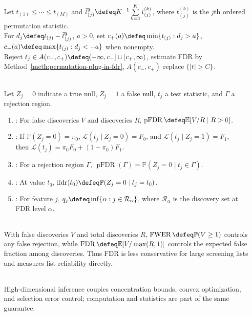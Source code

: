 \begin{remark} \label{rem:sam-asymmetric-cutpoints} \\
Let $t_{(1)}\leq\cdots\leq t_{(M)}$ and $\bar{t}^{0}_{(j)}\defeq K^{-1}\sum\limits_{k=1}^Kt^{(k)}_{(j)}$, where $t^{(k)}_{(j)}$ is the $j$th ordered permutation statistic.\\
For $d_j\defeq t_{(j)}-\bar{t}^{0}_{(j)}$, $a>0$, set $c_+(a)\defeq\min\{t_{(j)}:d_j>a\}$, $c_-(a)\defeq\max\{t_{(j)}:d_j<-a\}$ when nonempty.\\
Reject $t_j\in A(c_-,c_+)\defeq(-\infty,c_-]\cup[c_+,\infty)$, estimate FDR by Method~\ref{meth:permutation-plug-in-fdr}, $A(c_-,c_+)$ replace $\{|t|>C\}$.
\end{remark}

\begin{definition} \label{def:pfd-local-fdr-and-q-value} \\
Let $Z_j=0$ indicate a true null, $Z_j=1$ a false null, $t_j$ a test statistic, and $\Gamma$ a rejection region.
\begin{enumerate}[label=(\roman*)]
\setlength{\itemsep}{0pt}
\item {}: For false discoveries $V$ and discoveries $R$, $\operatorname{pFDR}\defeq\mathbb{E}[V/R\mid R>0]$.
\item {}: If $\mathbb{P}(Z_j=0)=\pi_0$, $\mathcal{L}(t_j\mid Z_j=0)=F_0$, and $\mathcal{L}(t_j\mid Z_j=1)=F_1$,\\
then $\mathcal{L}(t_j)=\pi_0F_0+(1-\pi_0)F_1$.
\item {}: For a rejection region $\Gamma$, $\operatorname{pFDR}(\Gamma)=\mathbb{P}(Z_j=0\mid t_j\in\Gamma)$.
\item {}: At value $t_0$, $\operatorname{lfdr}(t_0)\defeq\mathbb{P}(Z_j=0\mid t_j=t_0)$.
\item {}: For feature $j$, $q_j\defeq\inf\{\alpha:j\in\mathcal{R}_\alpha\}$, where $\mathcal{R}_\alpha$ is the discovery set at FDR level $\alpha$.
\end{enumerate}
\end{definition}

\begin{remark} \label{rem:fdr-versus-family-wise-error} \\
With false discoveries $V$ and total discoveries $R$, $\operatorname{FWER}\defeq\mathbb{P}(V\geq1)$ controls any false rejection, while $\operatorname{FDR}\defeq\mathbb{E}[V/\max(R,1)]$ controls the expected false fraction among discoveries.
Thus FDR is less conservative for large screening lists and measures list reliability directly.
\end{remark}

\begin{remark} \label{rem:high-dimensional-cross-reference-optimization} \\
High-dimensional inference couples concentration bounds, convex optimization, and selection error control; computation and statistics are part of the same guarantee.
\end{remark}
